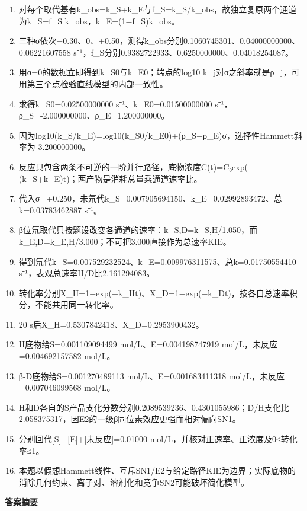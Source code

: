 \documentclass[UTF8,11pt,a4paper]{ctexart}
\begin{document}
\begin{enumerate}
\item 对每个取代基有k\_obs=k\_S+k\_E与f\_S=k\_S/k\_obs，故独立复原两个通道为k\_S=f\_S k\_obs，k\_E=(1−f\_S)k\_obs。
\item 三种σ依次−0.30、0、+0.50，测得k\_obs分别0.1060745301、0.04000000000、0.06221607558 s⁻¹，f\_S分别0.9382722933、0.6250000000、0.04018254087。
\item 用σ=0的数据立即得到k\_S0与k\_E0；端点的log10 k\_j对σ之斜率就是ρ\_j，可用第三个点检验直线模型的内部一致性。
\item 求得k\_S0=0.02500000000 s⁻¹、k\_E0=0.01500000000 s⁻¹，ρ\_S=-2.000000000、ρ\_E=1.200000000。
\item 因为log10(k\_S/k\_E)=log10(k\_S0/k\_E0)+(ρ\_S−ρ\_E)σ，选择性Hammett斜率为-3.200000000。
\item 反应只包含两条不可逆的一阶并行路径，底物浓度C(t)=C₀exp(−(k\_S+k\_E)t)；两产物是消耗总量乘通道速率比。
\item 代入σ=+0.250，未氘代k\_S=0.007905694150、k\_E=0.02992893472、总k=0.03783462887 s⁻¹。
\item β位氘取代只按题设改变各通道的速率：k\_S,D=k\_S,H/1.050，而k\_E,D=k\_E,H/3.000；不可把3.000直接作为总速率KIE。
\item 得到氘代k\_S=0.007529232524、k\_E=0.009976311575、总k=0.01750554410 s⁻¹，表观总速率H/D比2.161294083。
\item 转化率分别X\_H=1−exp(−k\_Ht)、X\_D=1−exp(−k\_Dt)，按各自总速率积分，不能共用同一转化率。
\item 20 s后X\_H=0.5307842418、X\_D=0.2953900432。
\item H底物给S=0.001109094499 mol/L、E=0.004198747919 mol/L，未反应=0.004692157582 mol/L。
\item β-D底物给S=0.001270489113 mol/L、E=0.001683411318 mol/L，未反应=0.007046099568 mol/L。
\item H和D各自的S产品支化分数分别0.2089539236、0.4301055986；D/H支化比2.058375317，因E2的一级β同位素效应更强而相对偏向SN1。
\item 分别回代[S]+[E]+[未反应]=0.01000 mol/L，并核对正速率、正浓度及0≤转化率≤1。
\item 本题以假想Hammett线性、互斥SN1/E2与给定路径KIE为边界；实际底物的消除几何约束、离子对、溶剂化和竞争SN2可能破坏简化模型。
\end{enumerate}
\noindent\textbf{答案摘要}\par
\end{document}
